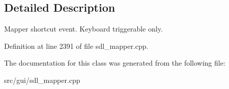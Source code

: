 \subsection{Detailed Description}
Mapper shortcut event. Keyboard triggerable only. 

Definition at line 2391 of file sdl\-\_\-mapper.\-cpp.



The documentation for this class was generated from the following file\-:\begin{DoxyCompactItemize}
\item 
src/gui/sdl\-\_\-mapper.\-cpp\end{DoxyCompactItemize}
